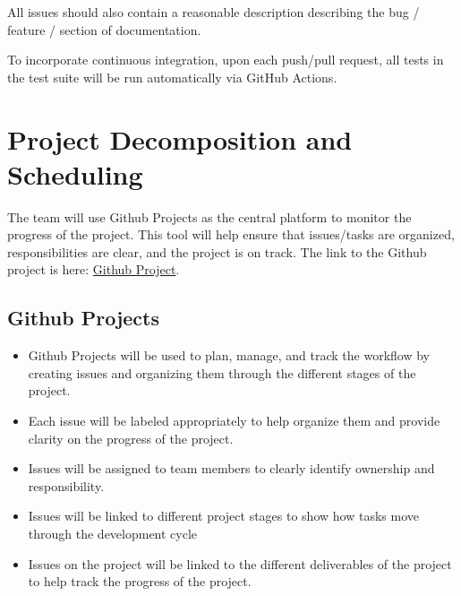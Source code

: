 \documentclass{article}
\begin{document}
All issues should also contain a reasonable description describing the bug / feature / 
section of documentation.

To incorporate continuous integration, upon each push/pull request, all tests in the test suite
will be run automatically via GitHub Actions.

\section{Project Decomposition and Scheduling}

\iffalse
\begin{itemize}
  \item How will you be using GitHub projects?
  \item Include a link to your GitHub project
\end{itemize}

\wss{How will the project be scheduled?  This is the big picture schedule, not
details. You will need to reproduce information that is in the course outline
for deadlines.}
\fi

The team will use Github Projects as the central platform to monitor the progress of the project. This tool will help ensure that issues/tasks are organized, responsibilities are clear, and the project is on track. The link to the Github project is here: \href{https://github.com/users/OmarHassanAdelhamid/projects/2/views/1}{Github Project}.

\subsection{Github Projects}
\begin{itemize}
  \item Github Projects will be used to plan, manage, and track the workflow by creating issues and organizing them through the different stages of the project.
  \item Each issue will be labeled appropriately to help organize them and provide clarity on the progress of the project.
  \item Issues will be assigned to team members to clearly identify ownership and responsibility.
  \item Issues will be linked to different project stages to show how tasks move through the development cycle
  \item Issues on the project will be linked to the different deliverables of the project to help track the progress of the project.
\end{itemize}
\end{document}
